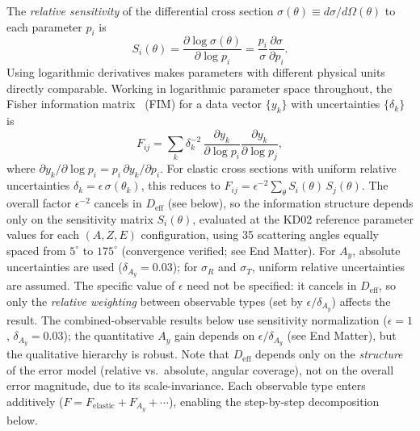 \documentclass[aps,prl,reprint,superscriptaddress,showpacs]{revtex4-2}
\begin{document}
The \emph{relative sensitivity} of the differential cross section $\sigma(\theta) \equiv d\sigma/d\Omega(\theta)$ to each parameter $p_i$ is
\begin{equation}
S_i(\theta) = \frac{\partial \log \sigma(\theta)}{\partial \log p_i} = \frac{p_i}{\sigma} \frac{\partial \sigma}{\partial p_i}.
\end{equation}
Using logarithmic derivatives makes parameters with different physical units directly comparable. Working in logarithmic parameter space throughout, the Fisher information matrix~\cite{Fisher1925} (FIM) for a data vector $\{y_k\}$ with uncertainties $\{\delta_k\}$ is
\begin{equation}
F_{ij} = \sum_k \delta_k^{-2}\,\frac{\partial y_k}{\partial \log p_i}\frac{\partial y_k}{\partial \log p_j},
\end{equation}
where $\partial y_k / \partial \log p_i = p_i\,\partial y_k / \partial p_i$. For elastic cross sections with uniform relative uncertainties $\delta_k = \epsilon\,\sigma(\theta_k)$, this reduces to $F_{ij} = \epsilon^{-2} \sum_\theta S_i(\theta)\, S_j(\theta)$. The overall factor $\epsilon^{-2}$ cancels in $D_\mathrm{eff}$ (see below), so the information structure depends only on the sensitivity matrix $S_i(\theta)$, evaluated at the KD02 reference parameter values for each $(A, Z, E)$ configuration, using 35 scattering angles equally spaced from $5^\circ$ to $175^\circ$ (convergence verified; see End Matter). For $A_y$, absolute uncertainties are used ($\delta_{A_y} = 0.03$); for $\sigma_R$ and $\sigma_T$, uniform relative uncertainties are assumed. The specific value of $\epsilon$ need not be specified: it cancels in $D_\mathrm{eff}$, so only the \emph{relative weighting} between observable types (set by $\epsilon / \delta_{A_y}$) affects the result. The combined-observable results below use sensitivity normalization ($\epsilon = 1$, $\delta_{A_y} = 0.03$); the quantitative $A_y$ gain depends on $\epsilon/\delta_{A_y}$ (see End Matter), but the qualitative hierarchy is robust. Note that $D_\mathrm{eff}$ depends only on the \emph{structure} of the error model (relative vs.\ absolute, angular coverage), not on the overall error magnitude, due to its scale-invariance. Each observable type enters additively ($F = F_\mathrm{elastic} + F_{A_y} + \cdots$), enabling the step-by-step decomposition below.
\end{document}
